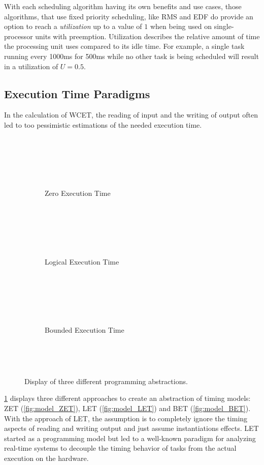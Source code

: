 With each scheduling algorithm having its own benefits and use cases, those algorithms, that use fixed priority scheduling, like \ac{RMS} and \ac{EDF} do provide an option to reach a \textit{utilization} up to a value of $1$ when being used on single-processor units with preemption\cite{liuSchedulingAlgorithmsMultiprogramming1973}.
Utilization describes the relative amount of time the processing unit uses compared to its idle time.
For example, a single task running every 1000ms for 500ms while no other task is being scheduled will result in a utilization of $U=0.5$.

\subsection{Execution Time Paradigms}\label{sec:let}
In the calculation of \ac{WCET}, the reading of input and the writing of output often led to too pessimistic estimations of the needed execution time.
\begin{figure}[t!]
    \begin{subfigure}[c]{0.32\textwidth}
        \resizebox{\textwidth}{!}{%
            \label{fig:model_ZET}
            
 }
        \caption{Zero Execution Time}
    \end{subfigure}
    \hfill
    \begin{subfigure}[c]{0.32\textwidth}
        \resizebox{\textwidth}{!}{%
            \label{fig:model_LET}
            
 }
        \caption{Logical Execution Time}
    \end{subfigure}
    \hfill
    \begin{subfigure}[c]{0.32\textwidth}
        \resizebox{\textwidth}{!}{%
            \label{fig:model_BET}
            
 }
        \caption{Bounded Execution Time}
    \end{subfigure}
    \caption{Display of three different programming abstractions\cite{chakrabortyAdvancesRealTimeSystems2012}.}
    \label{fig:model_ZET_LET_BET}
\end{figure}
\cref{fig:model_ZET_LET_BET} displays three different approaches to create an abstraction of timing models: \ac{ZET} (\cref{fig:model_ZET}), \ac{LET} (\cref{fig:model_LET}) and \ac{BET} (\cref{fig:model_BET}).
With the approach of \ac{LET}, the assumption is to completely ignore the timing aspects of reading and writing output and just assume instantiations effects\cite{chakrabortyAdvancesRealTimeSystems2012}.
\ac{LET} started as a programming model but led to a well-known paradigm for analyzing real-time systems to decouple the timing behavior of tasks from the actual execution on the hardware. \
